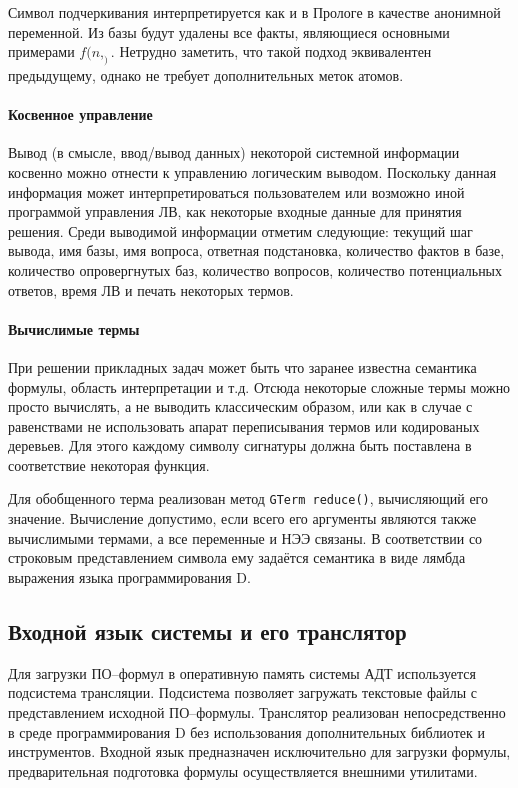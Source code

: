 Символ подчеркивания интерпретируется как и в Прологе в качестве анонимной переменной. Из базы будут удалены все факты, являющиеся основными примерами  $f(n,_)$. Нетрудно заметить, что такой подход эквивалентен предыдущему, однако не требует дополнительных меток атомов.

\paragraph{Косвенное управление} Вывод (в смысле, ввод/вывод данных) некоторой системной информации косвенно можно отнести к управлению логическим выводом. Поскольку данная информация может интерпретироваться пользователем или возможно иной программой управления ЛВ, как некоторые входные данные для принятия решения. Среди выводимой информации отметим следующие: текущий шаг вывода, имя базы, имя вопроса, ответная подстановка, количество фактов в базе, количество опровергнутых баз, количество вопросов, количество потенциальных ответов, время ЛВ и печать некоторых термов.

\paragraph{Вычислимые термы} При решении прикладных задач может быть что заранее известна семантика формулы, область интерпретации и т.д. Отсюда некоторые сложные термы можно просто вычислять, а не выводить классическим образом, или как в случае с равенствами не использовать апарат переписывания термов или кодированых деревьев. Для этого каждому символу сигнатуры должна быть поставлена в соответствие некоторая функция.

Для обобщенного терма реализован метод \texttt{GTerm reduce()}, вычисляющий его значение. Вычисление допустимо, если всего его аргументы являются также вычислимыми термами, а все переменные и НЭЭ связаны. В соответствии со строковым представлением символа ему задаётся семантика в виде лямбда выражения языка программирования D.


\subsection{Входной язык системы и его транслятор}
Для загрузки ПО--формул в оперативную память системы АДТ используется подсистема трансляции. Подсистема позволяет загружать текстовые файлы с представлением исходной ПО--формулы. Транслятор реализован непосредственно в среде программирования D без использования дополнительных библиотек и инструментов.
Входной язык предназначен исключительно для загрузки формулы, предварительная подготовка формулы осуществляется внешними утилитами.

